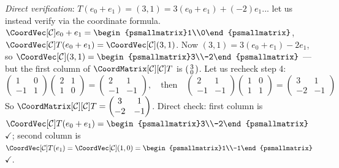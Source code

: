 \begin{example}
    \textit{Direct verification}: $T(e_0+e_1) = (3,1) = 3(e_0+e_1) + (-2)e_1$... let
    us instead verify via the coordinate formula.
    $\CoordVec[\mathcal{C}]{e_0+e_1} = \begin{psmallmatrix}1\\0\end{psmallmatrix}$,
    $\CoordVec[\mathcal{C}]{T(e_0+e_1)} = \CoordVec[\mathcal{C}]{(3,1)}$.
    Now $(3,1) = 3(e_0+e_1) - 2 e_1$, so
    $\CoordVec[\mathcal{C}]{(3,1)} = \begin{psmallmatrix}3\\-2\end{psmallmatrix}$
    --- but the first column of $\CoordMatrix[\mathcal{C}][\mathcal{C}]{T}$ is
    $\begin{psmallmatrix}3\\0\end{psmallmatrix}$. Let us recheck step 4:
    \[
        \begin{pmatrix} 1 & 0 \\ -1 & 1 \end{pmatrix}
        \begin{pmatrix} 2 & 1 \\ 1 & 0 \end{pmatrix}
        = \begin{pmatrix} 2 & 1 \\ -1 & -1 \end{pmatrix},
        \quad \text{then} \quad
        \begin{pmatrix} 2 & 1 \\ -1 & -1 \end{pmatrix}
        \begin{pmatrix} 1 & 0 \\ 1 & 1 \end{pmatrix}
        = \begin{pmatrix} 3 & 1 \\ -2 & -1 \end{pmatrix}
    \]
    So $\CoordMatrix[\mathcal{C}][\mathcal{C}]{T} = \begin{pmatrix} 3 & 1 \\ -2 & -1 \end{pmatrix}$.
    Direct check: first column is $\CoordVec[\mathcal{C}]{T(e_0+e_1)}
    = \begin{psmallmatrix}3\\-2\end{psmallmatrix}$ $\checkmark$; second column is
    $\CoordVec[\mathcal{C}]{T(e_1)} = \CoordVec[\mathcal{C}]{(1,0)}
    = \begin{psmallmatrix}1\\-1\end{psmallmatrix}$ $\checkmark$.
\end{example}

